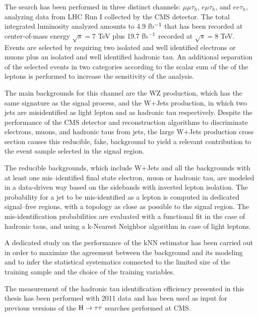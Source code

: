 The search has been performed in three distinct channels: $\mu\mu\tau_h$, $e\mu\tau_h$, and $ee\tau_h$, analyzing data from LHC Run I collected by the CMS detector. The total integrated luminosity analyzed amounts to 4.9 fb$^{-1}$ that has been recorded at center-of-mass energy $\sqrt{s} = 7$ TeV plus 19.7 fb$^{-1}$ recorded at $\sqrt{s} = 8$ TeV. Events are selected by requiring two isolated and well identified electrons or muons plus an isolated and well identified hadronic tau. An additional separation of the selected events in two categories according to the scalar sum of the \pT of the leptons is performed to increase %
the sensitivity of the analysis. 

The main backgrounds for this channel are the WZ production, which has the same signature as the signal process, and the W+Jets production, in which two jets are misidentified as light lepton and as hadronic tau respectively. 
Despite the performance of the CMS detector and reconstruction algorithms to discriminate electrons, muons, and hadronic taus from jets, the large W+Jets production cross section causes this reducible, fake, background to yield a relevant contribution to the event sample selected in the signal region.

The reducible backgrounds, which include W+Jets and all the backgrounds with at least one mis--identified final state electron, muon or hadronic tau, are modeled in a data-driven way based on the  sidebands with inverted lepton isolation. The probability for a jet to be mis-identified as a lepton is computed in dedicated signal--free regions, with a topology as close as possible to the signal region. The mis-identification probabilities are evaluated with a functional fit in the case of hadronic taus, and using a k-Nearest Neighbor algorithm in case of light leptons. 

A dedicated study on the performance of the kNN estimator has been carried out in order to maximize the agreement between the background and its modeling and to infer the statistical systematics connected to the limited size of the training sample and the choice of the training variables.

The measurement of the hadronic tau identification efficiency presented in this thesis has been performed with 2011 data and has been used as input for previous versions of the $\mathrm{H} \rightarrow \tau \tau$ searches performed at CMS.

